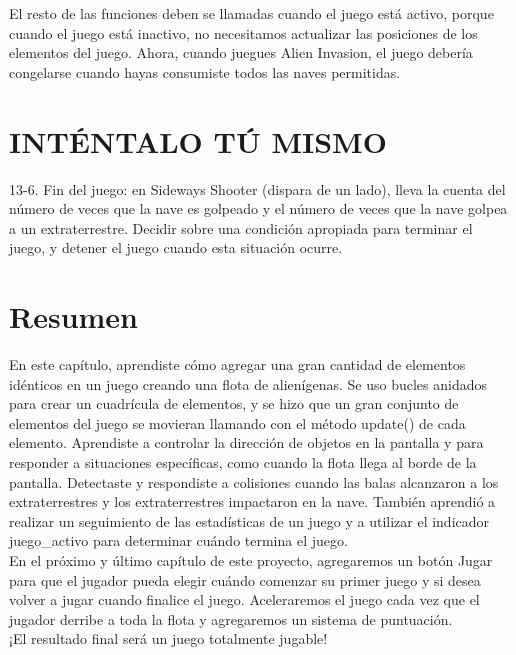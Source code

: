 El resto de las funciones  deben se llamadas cuando el juego está activo, porque cuando el juego
está inactivo, no necesitamos actualizar las posiciones de los elementos del juego.
Ahora, cuando juegues Alien Invasion, el juego debería congelarse cuando hayas consumiste todos las  naves permitidas.

\section{INTÉNTALO TÚ MISMO}

13-6. Fin del juego: en Sideways Shooter (dispara de un lado), lleva la cuenta del número de veces que
la nave es golpeado y el número de veces que  la nave golpea a un extraterrestre.
Decidir sobre una condición apropiada para terminar el juego, y detener el juego cuando esta situación
ocurre.

\section{Resumen}

En este capítulo, aprendiste cómo agregar una gran cantidad de elementos idénticos en un juego creando una flota de alienígenas.
Se uso  bucles anidados para crear un cuadrícula de elementos, y se hizo que un gran conjunto de elementos del juego se movieran llamando
con el  método {\ttfamily update()} de cada elemento. Aprendiste a controlar la dirección de
objetos en la pantalla y para responder a situaciones específicas, como cuando la flota llega al borde de la pantalla. Detectaste y respondiste a colisiones cuando las balas alcanzaron a los extraterrestres y los extraterrestres impactaron en la nave. También aprendió a realizar un seguimiento de las estadísticas de un juego y a utilizar el indicador {\ttfamily juego\_activo} para determinar cuándo 
termina el juego.\\


En el próximo y último capítulo de este proyecto, agregaremos un botón  {\ttfamily Jugar} para que el jugador pueda elegir cuándo
comenzar su primer juego y si desea volver a jugar cuando finalice el juego. 
Aceleraremos el juego cada vez que el jugador derribe a toda la flota y agregaremos un sistema de puntuación.\\ 

¡El resultado final será un juego totalmente jugable!







